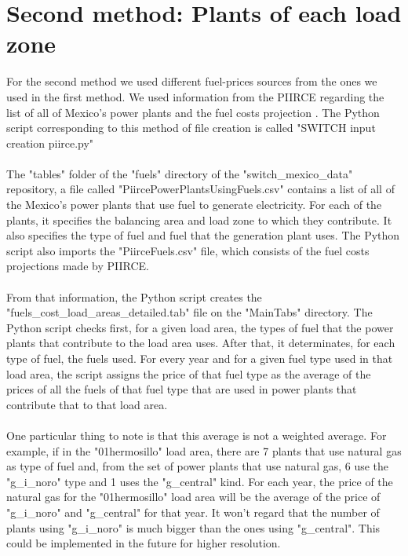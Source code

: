 \documentclass{article}
\begin{document}
\section{Second method: Plants of each load zone}
For the second method we used different fuel-prices sources from the ones we used in the first method. We used information from the PIIRCE regarding the list of all of Mexico's power plants\cite{piirceg} and the fuel costs projection \cite{piircef}. The Python script corresponding to this method of file creation is called "SWITCH input creation piirce.py"
\\
\\The "tables" folder of the "fuels" directory of the "switch\_mexico\_data" repository, a file called "PiircePowerPlantsUsingFuels.csv" contains a list of all of the Mexico's power plants that use fuel to generate electricity. For each of the plants, it specifies the balancing area and load zone to which they contribute. It also specifies the type of fuel and fuel that the generation plant uses. The Python script also imports the "PiirceFuels.csv" file, which consists of the fuel costs projections made by PIIRCE\cite{piircef}.
\\
\\From that information, the Python script creates the "fuels\_cost\_load\_areas\_detailed.tab" file on the "MainTabs" directory. The Python script checks first, for a given load area, the types of fuel that the power plants that contribute to the load area uses. After that, it determinates, for each type of fuel, the fuels used. For every year and for a given fuel type used in that load area, the script assigns the price of that fuel type as the average of the prices of all the fuels of that fuel type that are used in power plants that contribute that to that load area. 
\\
\\One particular thing to note is that this average is not a weighted average. For example, if in the "01\-hermosillo" load area, there are 7 plants that use natural gas as type of fuel and, from the set of power plants that use natural gas, 6 use the "g\_i\_noro" type and 1 uses the "g\_central"  kind. For each year, the price of the natural gas for the "01\-hermosillo" load area will be the average of the price of "g\_i\_noro" and "g\_central" for that year. It won't regard that the number of plants using "g\_i\_noro" is much bigger than the ones using "g\_central". This could be implemented in the future for higher resolution.
\end{document}
